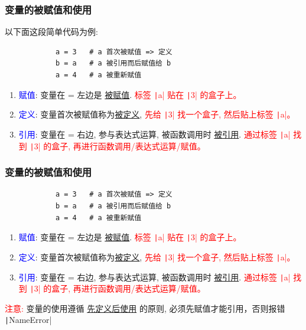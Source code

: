 \documentclass{ctexbeamer}
\begin{document}
    \begin{frame}[fragile]
        \frametitle{变量的被赋值和使用}
        以下面这段简单代码为例:
        \begin{verbatim}
            a = 3   # a 首次被赋值 => 定义
            b = a   # a 被引用而后赋值给 b
            a = 4   # a 被重新赋值
        \end{verbatim}

        \begin{enumerate}
            \item \textcolor{blue}{赋值}: 变量在 = 左边是 \underline{被赋值}.  \textcolor{red}{标签 \texttt|a| 贴在 \texttt|3| 的盒子上。} 
            \item \textcolor{blue}{定义}: 变量首次被赋值称为\underline{被定义}, \textcolor{red}{先给 \texttt|3| 找一个盒子, 然后贴上标签 \texttt|a|。} 
            \item \textcolor{blue}{引用}: 变量在 = 右边, 参与表达式运算, 被函数调用时 \underline{被引用}. \textcolor{red}{通过标签 \texttt|a| 找到 \texttt|3| 的盒子, 再进行函数调用/表达式运算/赋值。} 
        \end{enumerate}
    \end{frame}
    \begin{frame}[fragile]
        \frametitle{变量的被赋值和使用}
        \begin{verbatim}
            a = 3   # a 首次被赋值 => 定义
            b = a   # a 被引用而后赋值给 b
            a = 4   # a 被重新赋值
        \end{verbatim}

        \begin{enumerate}
            \item \textcolor{blue}{赋值}: 变量在 = 左边是 \underline{被赋值}.  \textcolor{red}{标签 \texttt|a| 贴在 \texttt|3| 的盒子上。} \pause
            \item \textcolor{blue}{定义}: 变量首次被赋值称为\underline{被定义}, \textcolor{red}{先给 \texttt|3| 找一个盒子, 然后贴上标签 \texttt|a|。}  \pause
            \item \textcolor{blue}{引用}: 变量在 = 右边, 参与表达式运算, 被函数调用时 \underline{被引用}. \textcolor{red}{通过标签 \texttt|a| 找到 \texttt|3| 的盒子, 再进行函数调用/表达式运算/赋值。} 
        \end{enumerate}
        \begin{notice}
            \textcolor{red}{注意:} 变量的使用遵循 \underline{先定义后使用} 的原则, 必须先赋值才能引用，否则报错 \texttt|NameError|
        \end{notice}
    \end{frame}
\end{document}
